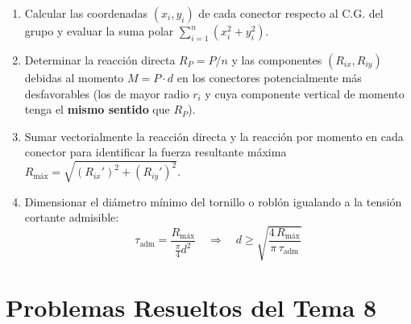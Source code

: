 \begin{ImportanteBox}[title={Procedimiento de Dimensionamiento con Carga Excéntrica}]
    \begin{enumerate}[label=\alph*)]
        \item Calcular las coordenadas $(x_i, y_i)$ de cada conector respecto al C.G. del grupo y evaluar la suma polar $\sum_{i=1}^{n}(x_i^2 + y_i^2)$.
        \item Determinar la reacción directa $R_P = P/n$ y las componentes $(R_{ix}, R_{iy})$ debidas al momento $M = P\cdot d$ en los conectores potencialmente más desfavorables (los de mayor radio $r_i$ y cuya componente vertical de momento tenga el \textbf{mismo sentido} que $R_P$).
        \item Sumar vectorialmente la reacción directa y la reacción por momento en cada conector para identificar la fuerza resultante máxima $R_{\text{máx}} = \sqrt{(R_{ix}')^2 + (R_{iy}')^2}$.
        \item Dimensionar el diámetro mínimo del tornillo o roblón igualando a la tensión cortante admisible:
              \begin{equation}
                  \tau_{\text{adm}} = \frac{R_{\text{máx}}}{\frac{\pi}{4}d^2} \quad \Longrightarrow \quad d \ge \sqrt{\frac{4\,R_{\text{máx}}}{\pi\,\tau_{\text{adm}}}}
                  \label{eq:t8_diametro_excentrica}
              \end{equation}
    \end{enumerate}
\end{ImportanteBox}

\section{Problemas Resueltos del Tema 8}

